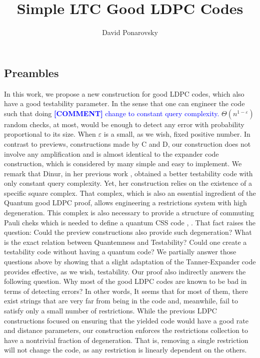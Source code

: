 \documentclass{article}
\newcommand{\commentt}[1]{\textcolor{blue}{ \textbf{[COMMENT]} #1}}
\newcommand{\ctt}[1]{\commentt{#1}}
\begin{document}
\title{Simple LTC Good LDPC Codes} 
\author{David Ponarovsky}
\maketitle
{} 
\begin{multicols*}{2}
  \section{Preambles}
  In this work, we propose a new construction for good LDPC codes, which also have a good testability parameter. In the sense that one can engineer the code such that doing \ctt{change to constant query complexity. } $\Theta\left( n^{1-\varepsilon}\right)$ random checks, at most, would be enough to detect any error with probability proportional to its size. When $\varepsilon$ is a small, as we wish, fixed positive number. In contrast to previews, constructions made by C and D, our construction does not involve any amplification and is almost identical to the expander code construction, which is considered by many simple and easy to implement. We remark that Dinur, in her previous work \cite{Dinur}, obtained a better testability code with only constant query complexity. 
  Yet, her construction relies on the existence of a specific square complex. That complex, which is also an essential ingredient of the Quantum good LDPC proof, allows engineering a restrictions system with high degeneration. This complex is also necessary to provide a structure of commuting Pauli cheks which is needed to define a quantum CSS code \cite{Pavel}, \cite{leverrier2022quantum}. That fact raises the question: Could the preview constructions also provide such degeneration? What is the exact relation between Quantemness and Testability? Could one create a testability code without having a quantum code? We partially answer those questions above by showing that a slight adaptation of the Tanner-Expander code provides effective, as we wish, testability.
  Our proof also indirectly answers the following question. Why most of the good LDPC codes are known to be bad in terms of detecting errors? In other words, It seems that for most of them, there exist strings that are very far from being in the code and, meanwhile, fail to satisfy only a small number of restrictions.
  While the previous LDPC constructions focused on ensuring that the yielded code would have a good rate and distance parameters, our construction enforces the restrictions collection to have a nontrivial fraction of degeneration. That is, removing a single restriction will not change the code, as any restriction is linearly dependent on the others.




\end{multicols*}
\end{document}
